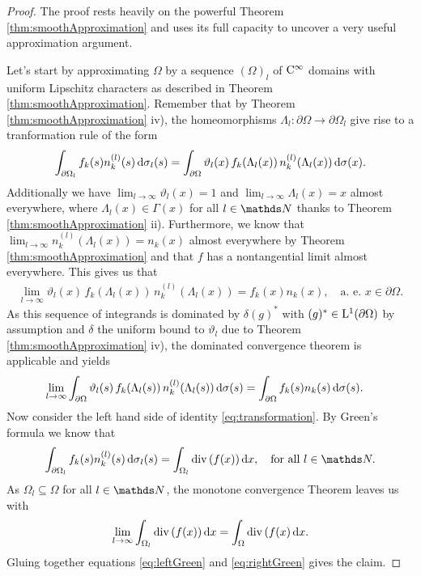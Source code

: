\begin{proof}
  The proof rests heavily on the powerful Theorem \ref{thm:smoothApproximation} and uses its full capacity to uncover a very useful approximation argument.

  Let's start by approximating $\Omega$ by a sequence $(\Omega)_l$ of $\mathrm{C}^\infty$ domains with uniform Lipschitz characters as described in Theorem \ref{thm:smoothApproximation}. 
  Remember that by Theorem \ref{thm:smoothApproximation} iv), the homeomorphisms $\Lambda_l \colon \partial\Omega \to \partial\Omega_l$ give rise to a tranformation rule of the form 
  \begin{align}
    \label{eq:transformation}
    \int_{\partial\Omega_l} f_k(s) n_k^{(l)}(s) \, {\operatorname{d}\!{\sigma}}_l(s)
    = \int_{\partial\Omega} \vartheta_l(x) \, f_k(\Lambda_l(x)) \, n_k^{(l)}(\Lambda_l(x)) \, {\operatorname{d}\!{\sigma}}(x).
  \end{align}
  Additionally we have $\lim_{l \to \infty} \vartheta_l(x) = 1$ and $\lim_{l \to \infty} \Lambda_l(x) = x$ almost everywhere, where $\Lambda_l(x) \in \Gamma(x)$ for all $l \in \N$ thanks to Theorem \ref{thm:smoothApproximation} ii).
  Furthermore, we know that $\lim_{l \to \infty} n_k^{(l)}(\Lambda_l(x)) = n_k(x)$ almost everywhere by Theorem \ref{thm:smoothApproximation} and that $f$ has a nontangential limit almost everywhere.
  This gives us that 
  \begin{align*}
    \lim_{l \to \infty} \vartheta_l(x) \, f_k(\Lambda_l(x)) \, n_k^{(l)}(\Lambda_l(x)) = f_k(x) n_k(x), \quad\text{a. e. } x \in \partial\Omega.
  \end{align*}
  As this sequence of integrands is dominated by $\delta (g)^*$ with $(g)^* \in \mathrm{L}^1(\partial\Omega)$ by assumption and $\delta$ the uniform bound to $\vartheta_l$ due to Theorem \ref{thm:smoothApproximation} iv), the dominated convergence theorem is applicable and yields
  \begin{align}
    \label{eq:leftGreen}
    \lim_{l \to \infty} \int_{\partial \Omega} \vartheta_l(s) \, f_k(\Lambda_l(s))\,  n_k^{(l)}(\Lambda_l(s))\, {\operatorname{d}\!{\sigma}}(s)
    &= 
    \int_{\partial\Omega} f_k(s) n_k(s) \, {\operatorname{d}\!{\sigma}}(s).
  \end{align}
  Now consider the left hand side of identity \eqref{eq:transformation}.
  By Green's formula \cite[p. 711f.]{evans} we know that
  \begin{align*}
    \int_{\partial\Omega_l} f_k(s) n_k^{(l)}(s) \d\sigma_l(s)
    = \int_{\Omega_l} \div(f(x)) \d x, \quad\text{for all } l \in \N.
  \end{align*}
  As $\Omega_l \subseteq \Omega$ for all $l \in \N$, the monotone convergence Theorem leaves us with
  \begin{align}
    \label{eq:rightGreen}
    \lim_{l \to \infty} \int_{\Omega_l} \mathrm{div\,} (f(x)) \, {\operatorname{d}\!{x}} = \int_\Omega \mathrm{div\,} (f(x) \, {\operatorname{d}\!{x}}.
  \end{align}
  Gluing together equations \eqref{eq:leftGreen} and \eqref{eq:rightGreen} gives the claim.
\end{proof}

